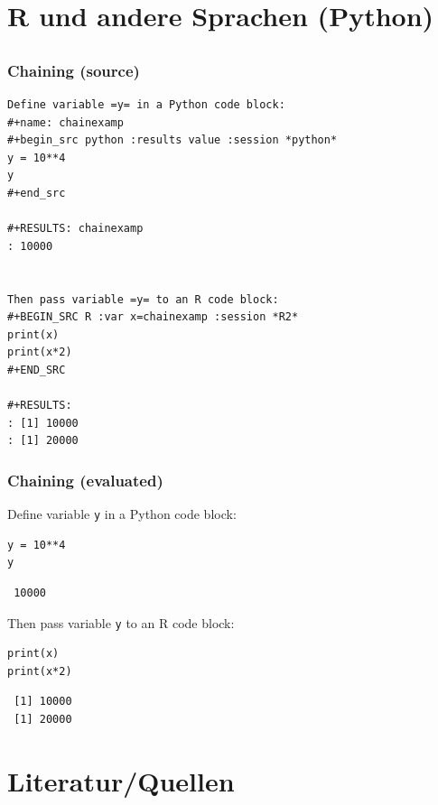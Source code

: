 \documentclass[bigger]{beamer}
\begin{document}
\section{R und andere Sprachen (Python)}
\label{sec-4}
\subsection{}
\begin{frame}[fragile,shrink = 10]
\frametitle{Chaining (source)}
\label{sec-4-1-1}




\lstset{language=org}
\begin{lstlisting}
Define variable =y= in a Python code block: 
#+name: chainexamp
#+begin_src python :results value :session *python*
y = 10**4
y
#+end_src

#+RESULTS: chainexamp
: 10000


Then pass variable =y= to an R code block:
#+BEGIN_SRC R :var x=chainexamp :session *R2*
print(x)
print(x*2)
#+END_SRC

#+RESULTS:
: [1] 10000
: [1] 20000
\end{lstlisting}
\end{frame}
\begin{frame}[fragile]
\frametitle{Chaining (evaluated)}
\label{sec-4-1-2}


Define variable \texttt{y} in a Python code block: 

\lstset{language=Python}
\begin{lstlisting}
y = 10**4
y
\end{lstlisting}

\begin{verbatim}
 10000
\end{verbatim}


Then pass variable \texttt{y} to an R code block:

\lstset{language=R}
\begin{lstlisting}
print(x)
print(x*2)
\end{lstlisting}

\begin{verbatim}
 [1] 10000
 [1] 20000
\end{verbatim}
\end{frame}
\section{Literatur/Quellen}
\label{sec-5}
\end{document}
